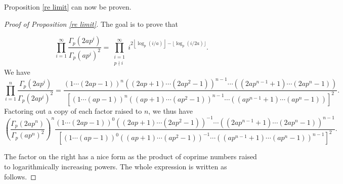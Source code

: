 \documentclass[12pt, letter]{article}    %
\theoremstyle{plain}
\theoremstyle{definition}
\numberwithin{equation}{section}
\newcommand{\thref}[1]{Theorem \ref{#1}}
\newcommand{\propref}[1]{Proposition \ref{#1}}
\providecommand{\floor}[1]{\left \lfloor #1 \right \rfloor }
\begin{document}
\propref{re limit} can now be proven.
\begin{proof}[Proof of \propref{re limit}]

The goal is to prove that 

$$
\prod_{i=1}^{\infty}\frac{\Gamma_p(2ap^i)}{\Gamma_p(ap^i)^2}=
\prod_{\substack{i=1\\p\nmid i}}^{\infty}i^{2\floor{\log_p(i/a)}-\lfloor{\log_p(i/2a)}\rfloor}.$$
We have
$$\prod_{i=1}^{n}\frac{\Gamma_p (2ap^i)}{\Gamma_p (2ap^i)^2} = \frac{(1 \cdots (2ap-1))^n((2ap+1) \cdots (2ap^2-1))^{n-1}\cdots((2ap^{n-1}+1) \cdots (2ap^{n}-1))}{[(1 \cdots (ap-1))^n((ap+1) \cdots (ap^2-1))^{n-1}\cdots((ap^{n-1}+1) \cdots (ap^{n}-1))]^2}.
$$
Factoring out a copy of each factor raised to $n$, we thus have
$$
\left(\frac{ \Gamma_p (2ap^n)}{ \Gamma_p (ap^n)^2}\right)^n \frac{(1 \cdots (2ap-1))^0((2ap+1) \cdots (2ap^2-1))^{-1}\cdots((2ap^{n-1}+1) \cdots (2ap^{n}-1))^{n-1}}{[(1 \cdots (ap-1))^0((ap+1) \cdots (ap^2-1))^{-1}\cdots((ap^{n-1}+1) \cdots (ap^{n}-1))^{n-1}]^2}.
$$

The factor on the right has a nice form as the product of coprime numbers raised to logarithmically increasing powers. The whole expression is written as follows.


\end{proof}
\end{document}
